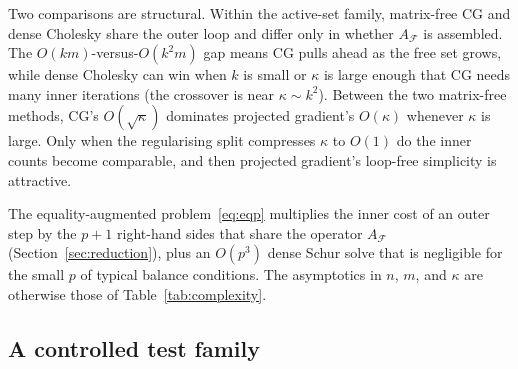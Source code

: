 Two comparisons are structural. Within the active-set family, matrix-free CG and dense
Cholesky share the outer loop and differ only in whether $A_{\mathcal{F}}$ is assembled. The
$O(km)$-versus-$O(k^2 m)$ gap means CG pulls ahead as the free set grows, while dense Cholesky
can win when $k$ is small or $\kappa$ is large enough that CG needs many inner iterations
(the crossover is near $\kappa \sim k^2$). Between the two matrix-free methods, CG's
$O(\sqrt\kappa)$ dominates projected gradient's $O(\kappa)$ whenever $\kappa$ is large. Only
when the regularising split compresses $\kappa$ to $O(1)$ do the inner counts become
comparable, and then projected gradient's loop-free simplicity is attractive.

The equality-augmented problem~\eqref{eq:eqp} multiplies the inner cost of an outer step by the
$p+1$ right-hand sides that share the operator $A_{\mathcal{F}}$
(Section~\ref{sec:reduction}), plus an $O(p^3)$ dense Schur solve that is negligible for the
small $p$ of typical balance conditions. The asymptotics in $n$, $m$, and $\kappa$ are
otherwise those of Table~\ref{tab:complexity}.

\subsection{A controlled test family}\label{ssec:synthetic}

